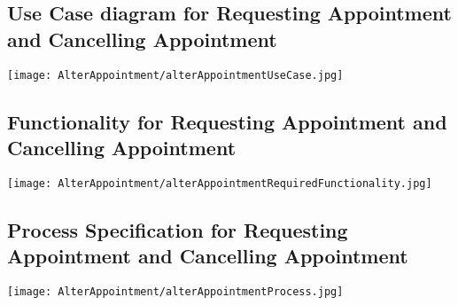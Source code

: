 \subsection{Use Case diagram for Requesting Appointment and Cancelling Appointment}
	\texttt{[image: AlterAppointment/alterAppointmentUseCase.jpg]}
	
\subsection{Functionality for Requesting Appointment and Cancelling Appointment}
	\texttt{[image: AlterAppointment/alterAppointmentRequiredFunctionality.jpg]}
	
\subsection{Process Specification for Requesting Appointment and Cancelling Appointment}
	\texttt{[image: AlterAppointment/alterAppointmentProcess.jpg]}


